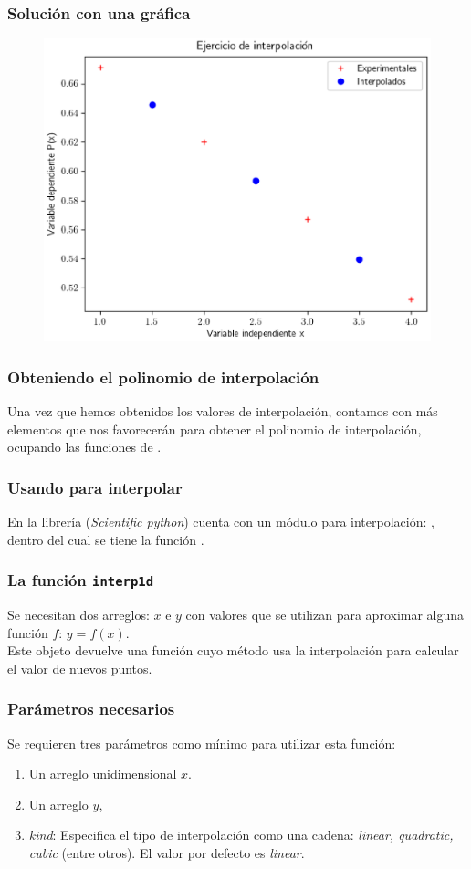 \documentclass[12pt]{beamer}
\begin{document}
\begin{frame}
\frametitle{Solución con una gráfica}
\begin{figure}
	\centering
	\includegraphics[scale=0.58]{Imagenes/Ejercicio_Interpolacion_02.eps}
\end{figure}
\end{frame}
\begin{frame}
\frametitle{Obteniendo el polinomio de interpolación}
Una vez que hemos obtenidos los valores de interpolación, contamos con más elementos que nos favorecerán para obtener el polinomio de interpolación, ocupando las funciones de \python.
\end{frame}
\begin{frame}
\frametitle{Usando \python{} para interpolar}
En la librería  (\textit{Scientific python}) cuenta con un módulo para interpolación: \pause {}, dentro del cual se tiene la función \pause {}.
\end{frame}
\begin{frame}
\frametitle{La función \texttt{interp1d}}
Se necesitan dos arreglos: $x$ e $y$ con valores que se utilizan para aproximar alguna función $f: \, y = f (x)$.
\\
\bigskip
\pause
Este objeto devuelve una función cuyo método usa la interpolación para calcular el valor de nuevos puntos.
\end{frame}
\begin{frame}
\frametitle{Parámetros necesarios}
Se requieren tres parámetros como mínimo para utilizar esta función:
\pause
{}
\begin{enumerate}[<+->]
\item Un arreglo unidimensional $x$.
\item Un arreglo $y$,
\item \textit{kind}: Especifica el tipo de interpolación como una cadena: \textit{linear, quadratic, cubic} (entre otros). El valor por defecto es \textit{linear}.
\end{enumerate}
\end{frame}
\end{document}
